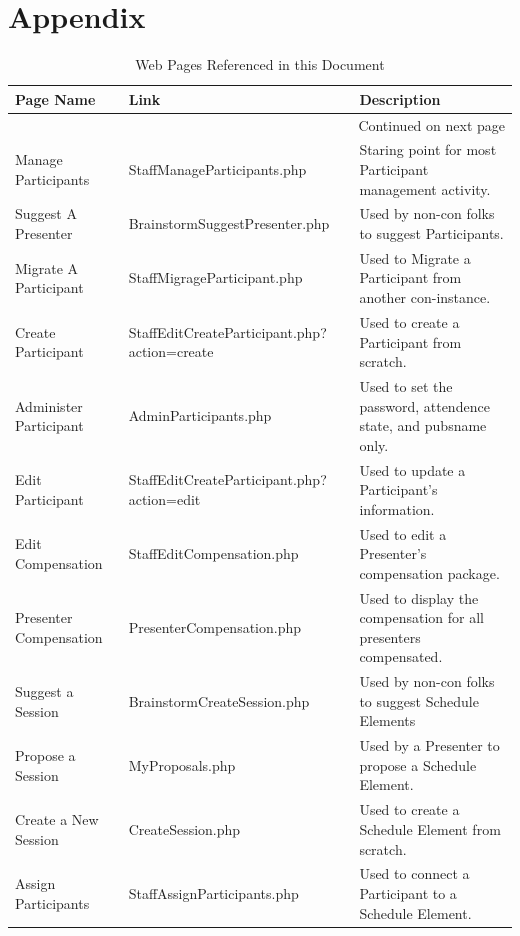 \documentclass[captions=tablesignature]{scrartcl}
\begin{document}
\newpage
\appendix
{}

\section{Appendix}
\label{sec-7}
\begin{small}
\begin{longtable}{|l|l|l|}
\caption{\label{tbl:usefulpages}Web Pages Referenced in this Document}
\\
\hline
Page Name & Link & Description\\
\hline
\endhead
\hline\multicolumn{3}{r}{Continued on next page} \\
\endfoot
\endlastfoot
Manage Participants & StaffManageParticipants.php & Staring point for most Participant management activity.\\
Suggest A Presenter & BrainstormSuggestPresenter.php & Used by non-con folks to suggest Participants.\\
Migrate A Participant & StaffMigrageParticipant.php & Used to Migrate a Participant from another con-instance.\\
Create Participant & StaffEditCreateParticipant.php?action=create & Used to create a Participant from scratch.\\
Administer Participant & AdminParticipants.php & Used to set the password, attendence state, and pubsname only.\\
Edit Participant & StaffEditCreateParticipant.php?action=edit & Used to update a Participant's information.\\
Edit Compensation & StaffEditCompensation.php & Used to edit a Presenter's compensation package.\\
Presenter Compensation & PresenterCompensation.php & Used to display the compensation for all presenters compensated.\\
Suggest a Session & BrainstormCreateSession.php & Used by non-con folks to suggest Schedule Elements\\
Propose a Session & MyProposals.php & Used by a Presenter to propose a Schedule Element.\\
Create a New Session & CreateSession.php & Used to create a Schedule Element from scratch.\\
Assign Participants & StaffAssignParticipants.php & Used to connect a Participant to a Schedule Element.\\
\hline
\end{longtable}
\end{small}
\end{document}
